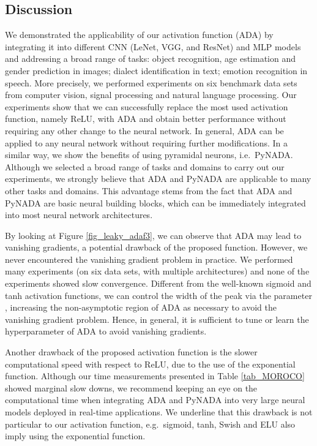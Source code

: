 \documentclass[pdflatex,sn-mathphys]{sn-jnl}
\theoremstyle{thmstyleone}
\theoremstyle{thmstyletwo}\newtheorem{example}{Example}\newtheorem{remark}{Remark}
\theoremstyle{thmstylethree}\newtheorem{definition}{Definition}\DeclareMathOperator{\sinc}{sinc}
\begin{document}
\subsection{Discussion}
\label{sec_discussion}

We demonstrated the applicability of our activation function (ADA) by integrating it into different CNN (LeNet, VGG, and ResNet) and MLP models and addressing a broad range of tasks: object recognition, age estimation and gender prediction in images; dialect identification in text; emotion recognition in speech. More precisely, we performed experiments on six benchmark data sets from computer vision, signal processing and natural language processing. Our experiments show that we can successfully replace the most used activation function, namely ReLU, with ADA and obtain better performance without requiring any other change to the neural network. In general, ADA can be applied to any neural network without requiring further modifications. In a similar way, we show the benefits of using pyramidal neurons, i.e.~PyNADA. Although we selected a broad range of tasks and domains to carry out our experiments, we strongly believe that ADA and PyNADA are applicable to many other tasks and domains. This advantage stems from the fact that ADA and PyNADA are basic neural building blocks, which can be immediately integrated into most neural network architectures.

By looking at Figure \ref{fig_leaky_adaf3}, we can observe that ADA may lead to vanishing gradients, a potential drawback of the proposed function. However, we never encountered the vanishing gradient problem in practice. We performed many experiments (on six data sets, with multiple architectures) and none of the experiments showed slow convergence. Different from the well-known sigmoid and tanh activation functions, we can control the width of the peak via the parameter , increasing the non-asymptotic region of ADA as necessary to avoid the vanishing gradient problem. Hence, in general, it is sufficient to tune or learn the hyperparameter  of ADA to avoid vanishing gradients.

Another drawback of the proposed activation function is the slower computational speed with respect to ReLU, due to the use of the exponential function. Although our time measurements presented in Table \ref{tab_MOROCO} showed marginal slow downs, we recommend keeping an eye on the computational time when integrating ADA and PyNADA into very large neural models deployed in real-time applications. We underline that this drawback is not particular to our activation function, e.g.~sigmoid, tanh, Swish \cite{Ramachandran-ICLRW-2018} and ELU \cite{Clevert-ICLR-2016} also imply using the exponential function.
\end{document}
